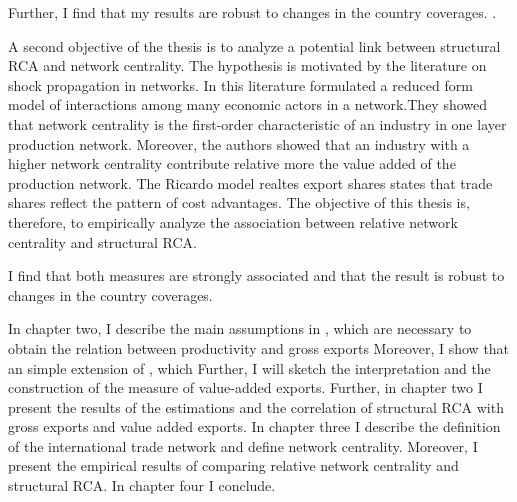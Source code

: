  Further, I find that my results are robust to changes in the country coverages. . \par
 A second objective of the thesis is to analyze a potential link between structural RCA and network centrality.
 The hypothesis is motivated by the literature on shock propagation in networks.
  In this literature \textcite{acemoglu2012} formulated a reduced form model of interactions among many economic actors in a network.They showed that network centrality is the first-order characteristic of an industry in one layer production network.
   Moreover, the authors showed that an industry with a higher network centrality contribute relative more the value added of the production network. 
     The Ricardo model realtes export shares states that trade shares reflect the pattern of cost advantages.
     The objective of this thesis is, therefore, to empirically analyze the association between relative network centrality and structural RCA. \par
I find that both measures are strongly associated and that the result is robust to changes in the country coverages.%
 \par %
In chapter two, I describe the main assumptions in \textcite{costinot}, which are necessary to obtain the relation between productivity and gross exports
Moreover, I show that an simple extension of \textcite{costinot}, which
 Further, I will sketch the interpretation and the construction of the measure of value-added exports.
  Further, in chapter two I present the results of the estimations and the correlation of structural RCA with gross exports and value added exports.
  In chapter three I describe the definition of the international trade network and define network centrality.
  Moreover, I present the empirical results of comparing relative network centrality and structural RCA.
  In chapter four I conclude.
\endinput
